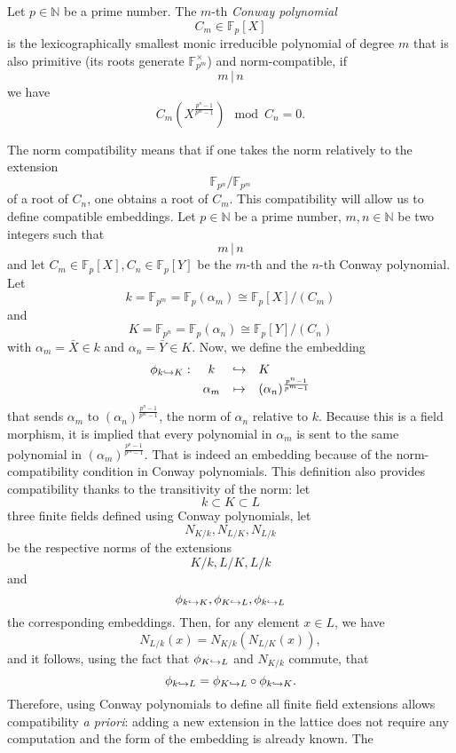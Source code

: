 \begin{defi}
  Let $p\in\mathbb{N}$ be a prime number. The $m$-th \emph{Conway polynomial}
  \[
    C_m\in\mathbb{F}_p[X]
  \]
  is the lexicographically smallest monic irreducible polynomial of degree $m$
  that is also primitive (\ie its roots generate $\mathbb{F}_{p^m}^\times$) and
  norm-compatible, \ie if
  \[
    m\,|\,n
  \]
  we have
  \[
    C_m(X^{\frac{p^n-1}{p^m-1}})\mod C_n = 0.
  \]
\end{defi}
The norm compatibility means that if one takes the norm relatively to the
extension 
\[
  \mathbb{F}_{p^n}/\mathbb{F}_{p^m}
\]
of a root of $C_n$, one obtains a root of $C_m$. This compatibility will allow
us to define compatible embeddings. Let $p\in\mathbb{N}$ be a prime number, $m,
n\in\mathbb{N}$ be two integers such that
\[
  m\,|\,n
\]
and let $C_m\in\mathbb{F}_{p}[X], C_n\in\mathbb{F}_{p}[Y]$ be the $m$-th and the $n$-th Conway
polynomial. Let 
\[
  k=\mathbb{F}_{p^m}=\mathbb{F}_p(\alpha_m)\cong\mathbb{F}_{p}[X]/(C_m)
\]
and
\[
  K = \mathbb{F}_{p^n}=\mathbb{F}_p(\alpha_n)\cong\mathbb{F}_{p}[Y]/(C_n)
\]
with $\alpha_m=\bar X\in k$ and $\alpha_n=\bar Y\in K$. Now, we define the
embedding
\[
\begin{array}{cccl}
  \phi_{k\hookrightarrow K}:&k&\hookrightarrow &K\\
  & \alpha_m&\mapsto&(\alpha_n)^{\frac{p^n-1}{p^m-1}}
\end{array}
\]
that sends $\alpha_m$ to $(\alpha_n)^{\frac{p^n-1}{p^m-1}}$, the norm of
$\alpha_n$ relative to $k$. Because this is a field morphism, it is implied that
every polynomial in $\alpha_m$ is sent to the same polynomial in
$(\alpha_m)^{\frac{p^n-1}{p^m-1}}$. That is indeed an embedding because of the
norm-compatibility condition in Conway polynomials. This definition also
provides compatibility thanks to the transitivity of the norm: let
\[
  k\subset K\subset L
\]
three finite fields defined using Conway polynomials, let
\[
  N_{K/k}, N_{L/K}, N_{L/k}
\]
be the respective norms of the extensions
\[
  K/k, L/K, L/k
\]
and
\[
  \phi_{k\hookrightarrow K}, \phi_{K\hookrightarrow L}, \phi_{k\hookrightarrow L}
\]
the corresponding embeddings. Then, for any element $x\in L$, we have
\[
  N_{L/k}(x) = N_{K/k}(N_{L/K}(x)),
\]
and it follows, using the fact that $\phi_{K\hookrightarrow L}$ and $N_{K/k}$ commute, that
\[
  \phi_{k\hookrightarrow L}=\phi_{K\hookrightarrow L}\circ\phi_{k\hookrightarrow K}.
\]
Therefore, using Conway polynomials to define all finite field extensions allows
compatibility \emph{a priori}: adding a new extension in the lattice does not
require any computation and the form of the embedding is already known. The
